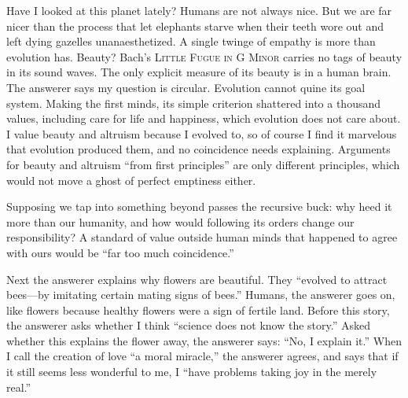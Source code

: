 Have I looked at this planet lately? Humans are not always nice. But we are far nicer than the process that let elephants starve when their teeth wore out and left dying gazelles unanaesthetized. A single twinge of empathy is more than evolution has. Beauty? Bach's \textsc{Little Fugue in G Minor} carries no tags of beauty in its sound waves. The only explicit measure of its beauty is in a human brain. The answerer says my question is circular. Evolution cannot quine its goal system. Making the first minds, its simple criterion shattered into a thousand values, including care for life and happiness, which evolution does not care about. I value beauty and altruism because I evolved to, so of course I find it marvelous that evolution produced them, and no coincidence needs explaining. Arguments for beauty and altruism ``from first principles'' are only different principles, which would not move a ghost of perfect emptiness either.

Supposing we tap into something beyond passes the recursive buck: why heed it more than our humanity, and how would following its orders change our responsibility? A standard of value outside human minds that happened to agree with ours would be ``far too much coincidence.'' 

Next the answerer explains why flowers are beautiful. They ``evolved to attract bees---by imitating certain mating signs of bees.''  Humans, the answerer goes on, like flowers because healthy flowers were a sign of fertile land. Before this story, the answerer asks whether I think ``science does not know the story.''  Asked whether this explains the flower away, the answerer says: ``No, I explain it.'' When I call the creation of love ``a moral miracle,'' the answerer agrees, and says that if it still seems less wonderful to me, I ``have problems taking joy in the merely real.''

